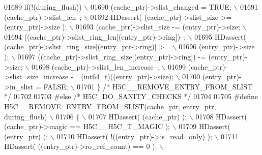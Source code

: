 \begin{DoxyCode}
01689 \textcolor{preprocessor}{    if(!(during\_flush))                                                     \(\backslash\)}
01690 \textcolor{preprocessor}{        (cache\_ptr)->slist\_changed = TRUE;                                  \(\backslash\)}
01691 \textcolor{preprocessor}{    (cache\_ptr)->slist\_len--;                                               \(\backslash\)}
01692 \textcolor{preprocessor}{    HDassert( (cache\_ptr)->slist\_size >= (entry\_ptr)->size );               \(\backslash\)}
01693 \textcolor{preprocessor}{    (cache\_ptr)->slist\_size -= (entry\_ptr)->size;                           \(\backslash\)}
01694 \textcolor{preprocessor}{    ((cache\_ptr)->slist\_ring\_len[(entry\_ptr)->ring])--;                     \(\backslash\)}
01695 \textcolor{preprocessor}{    HDassert( (cache\_ptr)->slist\_ring\_size[(entry\_ptr->ring)] >=            \(\backslash\)}
01696 \textcolor{preprocessor}{              (entry\_ptr)->size );                                          \(\backslash\)}
01697 \textcolor{preprocessor}{    ((cache\_ptr)->slist\_ring\_size[(entry\_ptr)->ring]) -= (entry\_ptr)->size; \(\backslash\)}
01698 \textcolor{preprocessor}{    (cache\_ptr)->slist\_len\_increase--;                                      \(\backslash\)}
01699 \textcolor{preprocessor}{    (cache\_ptr)->slist\_size\_increase -= (int64\_t)((entry\_ptr)->size);       \(\backslash\)}
01700 \textcolor{preprocessor}{    (entry\_ptr)->in\_slist = FALSE;                                          \(\backslash\)}
01701 \textcolor{preprocessor}{\} }\textcolor{comment}{/* H5C\_\_REMOVE\_ENTRY\_FROM\_SLIST */}\textcolor{preprocessor}{}
01702 
01703 \textcolor{preprocessor}{#else }\textcolor{comment}{/* H5C\_DO\_SANITY\_CHECKS */}\textcolor{preprocessor}{}
01704 
01705 \textcolor{preprocessor}{#define H5C\_\_REMOVE\_ENTRY\_FROM\_SLIST(cache\_ptr, entry\_ptr, during\_flush)    \(\backslash\)}
01706 \textcolor{preprocessor}{\{                                                                           \(\backslash\)}
01707 \textcolor{preprocessor}{    HDassert( (cache\_ptr) );                                                \(\backslash\)}
01708 \textcolor{preprocessor}{    HDassert( (cache\_ptr)->magic == H5C\_\_H5C\_T\_MAGIC );                     \(\backslash\)}
01709 \textcolor{preprocessor}{    HDassert( (entry\_ptr) );                                                \(\backslash\)}
01710 \textcolor{preprocessor}{    HDassert( !((entry\_ptr)->is\_read\_only) );                               \(\backslash\)}
01711 \textcolor{preprocessor}{    HDassert( ((entry\_ptr)->ro\_ref\_count) == 0 );                           \(\backslash\)}

\end{DoxyCode}
